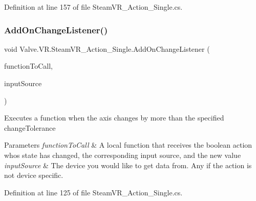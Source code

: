 Definition at line 157 of file Steam\+V\+R\+\_\+\+Action\+\_\+\+Single.\+cs.

\mbox{\label{class_valve_1_1_v_r_1_1_steam_v_r___action___single_ac3ae13457eeec363b6eefdf13ed6cc84}} 
\subsubsection{\texorpdfstring{AddOnChangeListener()}{AddOnChangeListener()}}
{\footnotesize\ttfamily void Valve.\+V\+R.\+Steam\+V\+R\+\_\+\+Action\+\_\+\+Single.\+Add\+On\+Change\+Listener (\begin{DoxyParamCaption}\item[{\mbox{\hyperlink{class_valve_1_1_v_r_1_1_steam_v_r___action___single_ae0c72c83dccd88a0235e8a831d62116e}{Change\+Handler}}}]{function\+To\+Call,  }\item[{\mbox{\hyperlink{namespace_valve_1_1_v_r_a82e5bf501cc3aa155444ee3f0662853f}{Steam\+V\+R\+\_\+\+Input\+\_\+\+Sources}}}]{input\+Source }\end{DoxyParamCaption})}



Executes a function when the axis changes by more than the specified change\+Tolerance 


\begin{DoxyParams}{Parameters}
{\em function\+To\+Call} & A local function that receives the boolean action who\textquotesingle{}s state has changed, the corresponding input source, and the new value\\
\hline
{\em input\+Source} & The device you would like to get data from. Any if the action is not device specific.\\
\hline
\end{DoxyParams}


Definition at line 125 of file Steam\+V\+R\+\_\+\+Action\+\_\+\+Single.\+cs.

\mbox{\label{class_valve_1_1_v_r_1_1_steam_v_r___action___single_a5a1d4b3c8ba06700a28cdcffbf3674ae}} 

